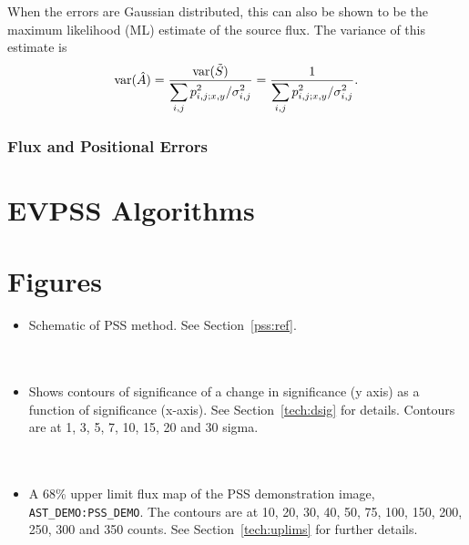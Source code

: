 When the errors are Gaussian distributed, this can also be shown to be the 
maximum likelihood (ML) estimate of the source flux. The variance of this 
estimate is 
\begin{equation}
\label{eq:fluxerr}
{\rm var}(\hat{A}) = \frac{{\rm var}(\tilde{S})}{\displaystyle \sum_{i,j}
p_{i,j;x,y}^2 /\sigma^2_{i,j}} = \frac{1}{\displaystyle \sum_{i,j} p_{i,j;x,y}^2
/\sigma^2_{i,j}}. 
\end{equation}

\subsubsection{Flux and Positional Errors}

\section{EVPSS Algorithms}

\section{Figures}
\label{figs}
\begin{itemize}
\item Schematic of PSS method. See Section~\ref{pss:ref}. \\ \\ \\
\item Shows contours of significance of a change in significance (y axis)
as a function of significance (x-axis). See Section~\ref{tech:dsig} for
details. Contours are at 1, 3, 5, 7, 10, 15, 20 and 30 sigma.\\ \\ \\
\item A 68\% upper limit flux map of the PSS demonstration image,
\verb+AST_DEMO:PSS_DEMO+. The contours are at 10, 20, 30, 40, 50, 75,
100, 150, 200, 250, 300 and 350 counts. See Section~\ref{tech:uplims} for
further details. \\ \\ \\
\end{itemize}

